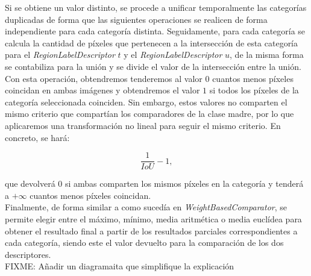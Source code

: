 Si se obtiene un valor distinto, se procede a unificar temporalmente las categorías duplicadas de forma que las siguientes operaciones se realicen de forma independiente para cada categoría distinta. Seguidamente, para cada categoría se calcula la cantidad de píxeles que pertenecen a la intersección de esta categoría para el \emph{RegionLabelDescriptor} $t$ y el \emph{RegionLabelDescriptor} $u$, de la misma forma se contabiliza para la unión y se divide el valor de la intersección entre la unión.\\

Con esta operación, obtendremos tenderemos al valor $0$ cuantos menos píxeles coincidan en ambas imágenes y obtendremos el valor $1$ si todos los píxeles de la categoría seleccionada coinciden. Sin embargo, estos valores no comparten el mismo criterio que compartían los comparadores de la clase madre, por lo que aplicaremos una transformación no lineal para seguir el mismo criterio. En concreto, se hará:

$$\frac{1}{IoU}-1,$$

que devolverá $0$ si ambas comparten los mismos píxeles en la categoría y tenderá a $+\infty$ cuantos menos píxeles coincidan.\\

Finalmente, de forma similar a como sucedía en \emph{WeightBasedComparator}, se permite elegir entre el máximo, mínimo, media aritmética o media euclídea para obtener el resultado final a partir de los resultados parciales correspondientes a cada categoría, siendo este el valor devuelto para la comparación de los dos descriptores.\\

FIXME: Añadir un diagramaita que simplifique la explicación
